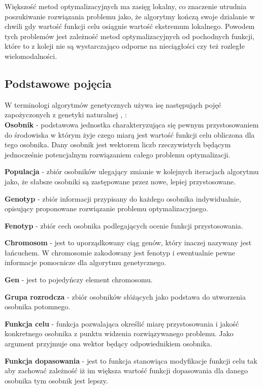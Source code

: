 Większość metod optymalizacyjnych ma zasięg lokalny, co znaczenie utrudnia poszukiwanie rozwiązania problemu jako, że algorytmy kończą swoje dzialanie w chwili gdy wartość funkcji celu osiągnie wartość ekstremum lokalnego. Powodem tych problemów jest zależność metod optymalizacyjnych od pochodnych funkcji, które to z koleji nie są wystarczająco odporne na nieciągłości czy też rozległe wielomodalności.
\par

\subsection{Podstawowe pojęcia}
W terminologi algorytmów genetycznych używa isę następująch pojęć zapożyczonych z genetyki naturalnej \cite{michal}, \cite{maszynowe_sel}:\\

\textbf{Osobnik} - podstawowa jednostka charakteryzująca się pewnym przystosowaniem do środowiska w którym żyje czego miarą jest wartość funkcji celu obliczona dla tego osobnika. Dany osobnik jest wektorem liczb rzeczywistych będącym jednocześnie potencjalnym rozwiązaniem całego problemu optymalizacji.

\textbf{Populacja} - zbiór osobników ulegający zmianie w kolejnych iteracjach algorytmu jako, że słabsze osobniki są zastępowane przez nowe, lepiej przystosowane.

\textbf{Genotyp} - zbiór informacji przypisany do każdego osobnika indywidualnie, opisujący proponowane rozwiązanie problemu optymalizacyjnego.

\textbf{Fenotyp} - zbiór cech osobnika podlegających ocenie funkcji przystosowania.

\textbf{Chromosom} - jest to uporządkowany ciąg genów, który inaczej nazywany jest łańcuchem. W chromosomie zakodowany jest fenotyp i ewentualnie pewne informacje pomocnicze dla algorytmu genetycznego.

\textbf{Gen} - jest to pojedyńczy element chromosomu.

\textbf{Grupa rozrodcza} - zbiór osobników słóżących jako podstawa do utworzenia osobnika potomnego.

\textbf{Funkcja celu} - funkcja pozwalająca określić miarę przystosowania i jakość konkretnego osobnika z punktu widzenia rozwiązywanego problemu. Jako argument przyjmuje ona wektor będący odpowiednikiem osobnika.

\textbf{Funkcja dopasowania} - jest to funkcja stanowiąca modyfikacje funkcji celu tak aby zachować zależność iż im większa wartość funkcji dopasowania dla danego osobnika tym osobnik jest lepszy.

